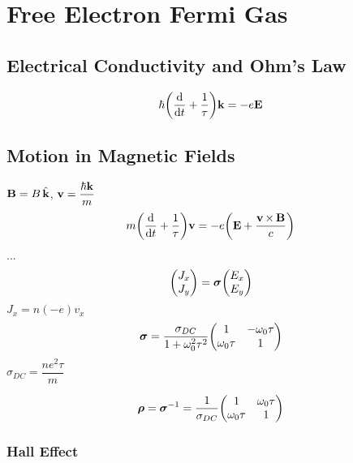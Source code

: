 \documentclass[UTF8]{ctexart} %
\DeclareMathOperator{\ti}{\times}
\DeclareMathOperator{\hk}{\hat{\vb{k}}}
\numberwithin{equation}{section}
\begin{document}
\section{Free Electron Fermi Gas}
\subsection{Electrical Conductivity and Ohm's Law}
\begin{equation}\label{key}
\hbar\qty(\dv{t} + \dfrac{1}{\tau})\vb{k} = -e\vb{E}
\end{equation}
\subsection{Motion in Magnetic Fields}
$ \vb{B} = B\hk $, $ \vb{v} = \dfrac{\hbar\vb{k}}{m} $
\begin{equation}\label{key}
m\qty(\dv{t} + \dfrac{1}{\tau})\vb{v} = -e\qty(\vb{E} + \dfrac{\vb{v}\ti\vb{B}}{c})
\end{equation}
...
\begin{equation}\label{key}
\mqty(J_x\\ J_y) = \bm{\sigma}\mqty(E_x\\ E_y)
\end{equation}
$ J_x = n(-e)v_x $
\begin{equation}\label{key}
\bm{\sigma} = \dfrac{\sigma_{DC}}{1 + \omega_0^2\tau^2}\mqty(1 & -\omega_0\tau\\ \omega_0\tau & 1)
\end{equation}
$ \sigma_{DC} = \dfrac{n e^2\tau}{m} $

\begin{equation}\label{key}
\bm{\rho} = \bm{\sigma}^{-1} = \dfrac{1}{\sigma
_{DC}}\mqty(1 & \omega_0\tau\\ \omega_0\tau & 1)
\end{equation}
\subsubsection{Hall Effect}
\end{document}
